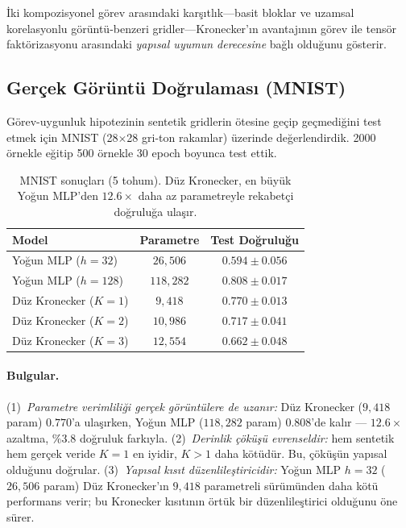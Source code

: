 \documentclass[11pt,a4paper]{article}
\begin{document}
İki kompozisyonel görev arasındaki karşıtlık---basit bloklar ve uzamsal
korelasyonlu görüntü-benzeri gridler---Kronecker'ın avantajının görev ile
tensör faktörizasyonu arasındaki \emph{yapısal uyumun derecesine} bağlı
olduğunu gösterir.

\subsection{Gerçek Görüntü Doğrulaması (MNIST)}
\label{sec:mnist}

Görev-uygunluk hipotezinin sentetik gridlerin ötesine geçip
geçmediğini test etmek için MNIST (28$\times$28 gri-ton rakamlar)
üzerinde değerlendirdik. 2000 örnekle eğitip 500 örnekle 30 epoch
boyunca test ettik.

\begin{table}[h]
\centering
\caption{MNIST sonuçları (5 tohum). Düz Kronecker, en büyük Yoğun
MLP'den $12.6\times$ daha az parametreyle rekabetçi doğruluğa ulaşır.}
\label{tab:mnist}
\small
\begin{tabular}{lcc}
\toprule
Model & Parametre & Test Doğruluğu \\
\midrule
Yoğun MLP ($h=32$)         & $26{,}506$  & $0.594 \pm 0.056$ \\
Yoğun MLP ($h=128$)        & $118{,}282$ & $0.808 \pm 0.017$ \\
Düz Kronecker ($K=1$)      & $9{,}418$   & $0.770 \pm 0.013$ \\
Düz Kronecker ($K=2$)      & $10{,}986$  & $0.717 \pm 0.041$ \\
Düz Kronecker ($K=3$)      & $12{,}554$  & $0.662 \pm 0.048$ \\
\bottomrule
\end{tabular}
\end{table}

\paragraph{Bulgular.}
(1)~\emph{Parametre verimliliği gerçek görüntülere de uzanır:}
Düz Kronecker ($9{,}418$ param) $0.770$'a ulaşırken, Yoğun MLP
($118{,}282$ param) $0.808$'de kalır --- $12.6\times$ azaltma,
$\%3.8$ doğruluk farkıyla.
(2)~\emph{Derinlik çöküşü evrenseldir:} hem sentetik hem gerçek
veride $K=1$ en iyidir, $K>1$ daha kötüdür. Bu, çöküşün yapısal
olduğunu doğrular.
(3)~\emph{Yapısal kısıt düzenlileştiricidir:} Yoğun MLP $h=32$
($26{,}506$ param) Düz Kronecker'ın $9{,}418$ parametreli sürümünden
daha kötü performans verir; bu Kronecker kısıtının örtük bir
düzenlileştirici olduğunu öne sürer.
\end{document}
